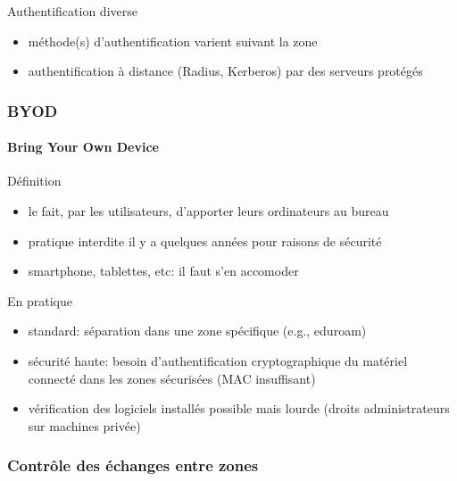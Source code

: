 \begin{reveals}
\begin{frame}
  \vfill

  \begin{block}{Authentification diverse}
    \begin{itemize}
    \item méthode(s) d'authentification varient suivant la zone
    \item authentification à distance (Radius, Kerberos) par des
      serveurs protégés
    \end{itemize}
  \end{block}

  \vfill

\end{frame}

\begin{frame}
  \frametitle{BYOD}
  \framesubtitle{Bring Your Own Device}

  \vfill

   \begin{block}{Définition}
     \begin{itemize}
     \item le fait, par les utilisateurs, d'apporter leurs ordinateurs
       au bureau
     \item pratique interdite il y a quelques années pour raisons de sécurité
     \item smartphone, tablettes, etc: il faut s'en accomoder
     \end{itemize}
  \end{block}

  \vfill

\begin{block}{En pratique}
  \begin{itemize}
  \item standard: séparation dans une zone spécifique (e.g., eduroam)
  \item sécurité haute: besoin d'authentification cryptographique du
    matériel connecté dans les zones sécurisées (MAC insuffisant)
  \item vérification des logiciels installés possible mais lourde
    (droits administrateurs sur machines privée)
  \end{itemize}
  \end{block}

  \vfill

\end{frame}

\begin{frame}
  \frametitle{Contrôle des échanges entre zones}


\end{frame}
\end{reveals}
